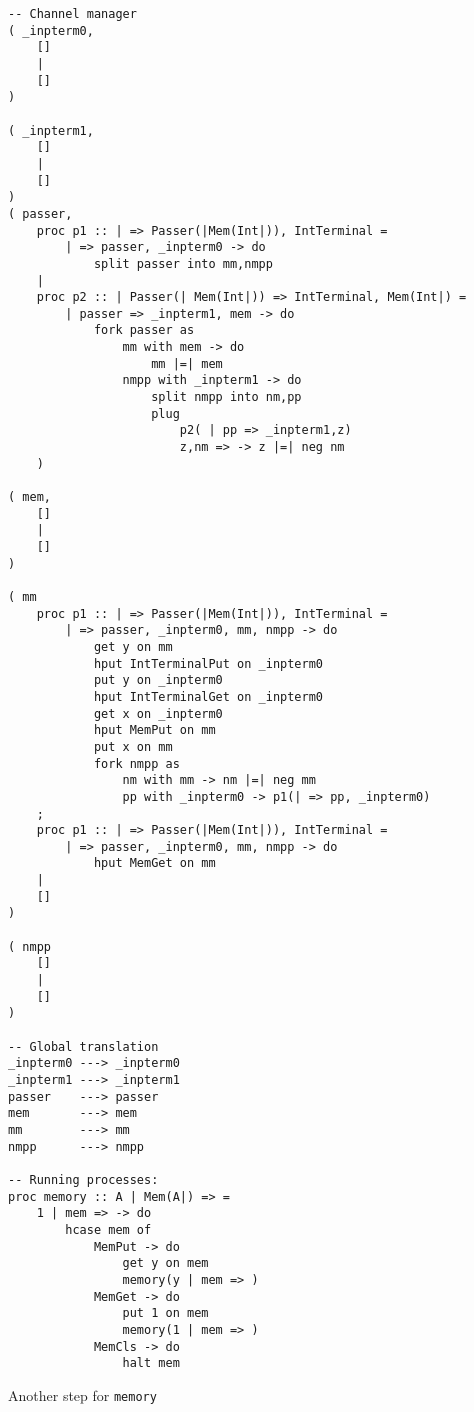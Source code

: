 \documentclass{article}
\theoremstyle{plain}%
\theoremstyle{definition}
\theoremstyle{remark}
\begin{document}
\begin{verbatim}
-- Channel manager
( _inpterm0,  
    []
    |
    []
)

( _inpterm1,  
    []
    |
    []
)
( passer,
    proc p1 :: | => Passer(|Mem(Int|)), IntTerminal = 
        | => passer, _inpterm0 -> do
            split passer into mm,nmpp 
    |
    proc p2 :: | Passer(| Mem(Int|)) => IntTerminal, Mem(Int|) =
        | passer => _inpterm1, mem -> do
            fork passer as
                mm with mem -> do
                    mm |=| mem
                nmpp with _inpterm1 -> do
                    split nmpp into nm,pp
                    plug
                        p2( | pp => _inpterm1,z)
                        z,nm => -> z |=| neg nm
    )

( mem,
    []
    |
    []
)

( mm
    proc p1 :: | => Passer(|Mem(Int|)), IntTerminal = 
        | => passer, _inpterm0, mm, nmpp -> do
            get y on mm
            hput IntTerminalPut on _inpterm0
            put y on _inpterm0
            hput IntTerminalGet on _inpterm0
            get x on _inpterm0
            hput MemPut on mm
            put x on mm
            fork nmpp as
                nm with mm -> nm |=| neg mm
                pp with _inpterm0 -> p1(| => pp, _inpterm0)
    ;
    proc p1 :: | => Passer(|Mem(Int|)), IntTerminal = 
        | => passer, _inpterm0, mm, nmpp -> do
            hput MemGet on mm 
    |
    []
)

( nmpp
    []
    |
    []
)

-- Global translation
_inpterm0 ---> _inpterm0 
_inpterm1 ---> _inpterm1 
passer    ---> passer 
mem       ---> mem
mm        ---> mm
nmpp      ---> nmpp

-- Running processes:
proc memory :: A | Mem(A|) => =
    1 | mem => -> do
        hcase mem of
            MemPut -> do
                get y on mem
                memory(y | mem => )
            MemGet -> do
                put 1 on mem
                memory(1 | mem => )
            MemCls -> do
                halt mem
\end{verbatim}
Another step for \verb|memory|
\end{document}
